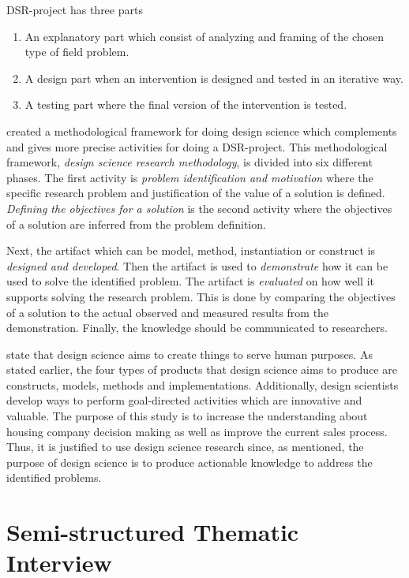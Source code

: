 DSR-project has three parts \begin{enumerate}
\item An explanatory part which consist of analyzing and framing of the chosen type of field problem.
\item A design part when an intervention is designed and tested in an iterative way.
\item A testing part where the final version of the intervention is tested. \parencite{Aken:2014}
\end{enumerate}

\textcite{Peffers:2007} created a methodological framework for doing design science which complements and gives more precise activities for doing a DSR-project. This methodological framework, \emph{design science research methodology}, is divided into six different phases. The first activity is \emph{problem identification and motivation} where the specific research problem and justification of the value of a solution is defined. \emph{Defining the objectives for a solution} is the second activity where the objectives of a solution are inferred from the problem definition.

Next, the artifact which can be model, method, instantiation or construct is \emph{designed and developed}. Then the artifact is used to \emph{demonstrate} how it can be used to solve the identified problem. The artifact is \emph{evaluated} on how well it supports solving the research problem. This is done by comparing the objectives of a solution to the actual observed and measured results from the demonstration. Finally, the knowledge should be communicated to researchers.

\textcite{Salvatore:1995} state that design science aims to create things to serve human purposes. As stated earlier, the four types of products that design science aims to produce are constructs, models, methods and implementations. Additionally, design scientists develop ways to perform goal-directed activities which are innovative and valuable. The purpose of this study is to increase the understanding about housing company decision making as well as improve the current sales process. Thus, it is justified to use design science research since, as mentioned, the purpose of design science is to produce actionable knowledge to address the identified problems.

\section{Semi-structured Thematic Interview}
\label{section:interview-info}

